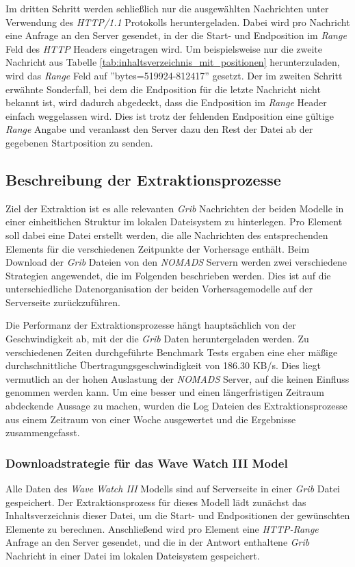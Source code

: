 Im dritten Schritt werden schließlich nur die ausgewählten Nachrichten
unter Verwendung des \textit{HTTP/1.1} Protokolls
heruntergeladen. Dabei wird pro Nachricht eine Anfrage an den Server
gesendet, in der die Start- und Endposition im \textit{Range} Feld des
\textit{HTTP} Headers eingetragen wird. Um beispielsweise nur die
zweite Nachricht aus Tabelle
\ref{tab:inhaltsverzeichnis_mit_positionen} herunterzuladen, wird das
\textit{Range} Feld auf ''bytes=519924-812417'' gesetzt. Der im
zweiten Schritt erwähnte Sonderfall, bei dem die Endposition für die
letzte Nachricht nicht bekannt ist, wird dadurch abgedeckt, dass die
Endposition im \textit{Range} Header einfach weggelassen wird. Dies
ist trotz der fehlenden Endposition eine gültige \textit{Range} Angabe
und veranlasst den Server dazu den Rest der Datei ab der gegebenen
Startposition zu senden.

\subsection{Beschreibung der Extraktionsprozesse}

Ziel der Extraktion ist es alle relevanten \textit{Grib} Nachrichten
der beiden Modelle in einer einheitlichen Struktur im lokalen
Dateisystem zu hinterlegen. Pro Element soll dabei eine Datei erstellt
werden, die alle Nachrichten des entsprechenden Elements für die
verschiedenen Zeitpunkte der Vorhersage enthält. Beim Download der
\textit{Grib} Dateien von den \textit{NOMADS} Servern werden zwei
verschiedene Strategien angewendet, die im Folgenden beschrieben
werden. Dies ist auf die unterschiedliche Datenorganisation der beiden
Vorhersagemodelle auf der Serverseite zurückzuführen.

Die Performanz der Extraktionsprozesse hängt hauptsächlich von der
Geschwindigkeit ab, mit der die \textit{Grib} Daten heruntergeladen
werden. Zu verschiedenen Zeiten durchgeführte Benchmark Tests ergaben
eine eher mäßige durchschnittliche Übertragungsgeschwindigkeit von
186.30 KB/s. Dies liegt vermutlich an der hohen Auslastung der
\textit{NOMADS} Server, auf die keinen Einfluss genommen werden
kann. Um eine besser und einen längerfristigen Zeitraum abdeckende
Aussage zu machen, wurden die Log Dateien des Extraktionsprozesse aus
einem Zeitraum von einer Woche ausgewertet und die Ergebnisse
zusammengefasst.

\subsubsection{Downloadstrategie für das Wave Watch III Model}
Alle Daten des \textit{Wave Watch III} Modells sind auf Serverseite in
einer \textit{Grib} Datei gespeichert. Der Extraktionsprozess für
dieses Modell lädt zunächst das Inhaltsverzeichnis dieser Datei, um
die Start- und Endpositionen der gewünschten Elemente zu
berechnen. Anschließend wird pro Element eine \textit{HTTP-Range}
Anfrage an den Server gesendet, und die in der Antwort enthaltene
\textit{Grib} Nachricht in einer Datei im lokalen Dateisystem
gespeichert.

